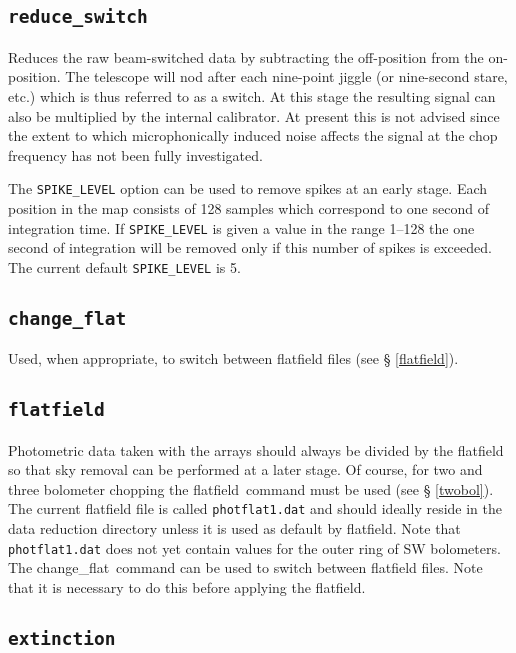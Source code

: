 \documentclass[twoside,11pt,fleqn]{article}
\newcommand{\task}[1]{{\sf #1}}
\newcommand{\param}[1]{{\tt #1}}
\newcommand{\chgflat}{\xref{\task{change\_flat}}{sun216}{CHANGE_FLAT}}
\newcommand{\flatf}{\xref{\task{flatfield}}{sun216}{FLATFIELD}}
\newcommand{\xref}[3]{#1}
\newcommand{\xlabel}[1]{}
\begin{document}
\subsection{{\tt reduce\_switch}}

Reduces the raw beam-switched data by subtracting the off-position
from the on-position. The telescope will nod after each nine-point
jiggle (or nine-second stare, etc.)  which is thus referred to as a
switch. At this stage the resulting signal can also be multiplied by the
internal calibrator. At present this is not advised since the extent
to which microphonically induced noise affects the signal at the chop
frequency has not been fully investigated.

The \param{SPIKE\_LEVEL} option can be used to remove spikes at an early
stage. Each position in the map consists of 128 samples which
correspond to one second of integration time. If \param{SPIKE\_LEVEL} is given
a value in the range 1--128 the one second of integration will be
removed only if this number of spikes is exceeded. The current default
\param{SPIKE\_LEVEL} is 5.

\subsection{{\tt change\_flat}}

Used, when appropriate, to switch between flatfield files (see \S
\ref{flatfield}).

\subsection{\xlabel{flatfield}{\tt flatfield}\label{flatfield}}

Photometric data taken with the arrays should always be divided by the
flatfield so that sky removal can be performed at a later stage. Of course,
for two and three bolometer chopping the \flatf\ command must be used (see \S
\ref{twobol}).  The current flatfield file is called {\tt photflat1.dat} and
should ideally reside in the data reduction directory unless it is used as
default by \flatf. Note that {\tt photflat1.dat} does not yet contain
values for the outer ring of SW bolometers. The \chgflat\ command can
be used to switch between flatfield files. Note that it is necessary to do
this before applying the flatfield.

\subsection{\xlabel{extinction}{\tt extinction}\label{extinction}}
\end{document}
